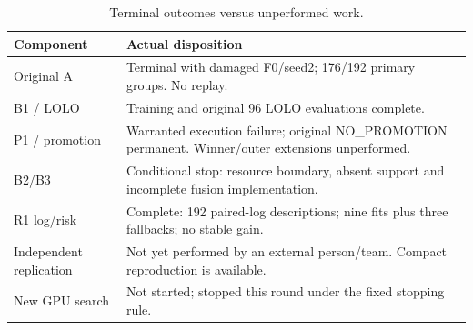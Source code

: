 \begin{table}[t]
\centering\footnotesize
\caption{Terminal outcomes versus unperformed work.}\label{tab:status}
\begin{tabular}{>{\raggedright\arraybackslash}p{}>{\raggedright\arraybackslash}p{}}\toprule
Component & Actual disposition\\\midrule
Original A & Terminal with damaged F0/seed2; 176/192 primary groups. No replay.\\
B1 / LOLO & Training and original 96 LOLO evaluations complete.\\
P1 / promotion & Warranted execution failure; original NO\_PROMOTION permanent. Winner/outer extensions unperformed.\\
B2/B3 & Conditional stop: resource boundary, absent support and incomplete fusion implementation.\\
R1 log/risk & Complete: 192 paired-log descriptions; nine fits plus three fallbacks; no stable gain.\\
Independent replication & Not yet performed by an external person/team. Compact reproduction is available.\\
New GPU search & Not started; stopped this round under the fixed stopping rule.\\\bottomrule
\end{tabular}
\end{table}
